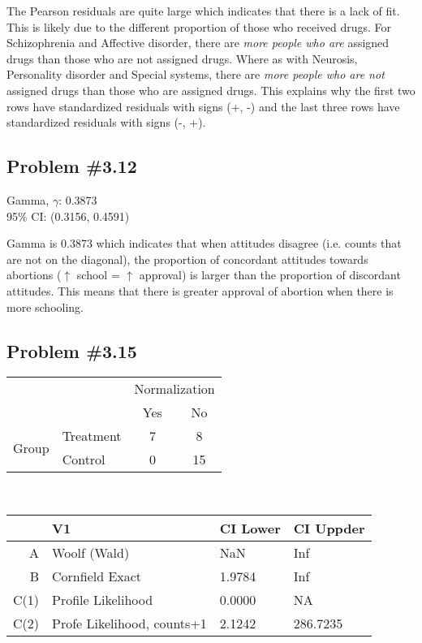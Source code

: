 \documentclass[12pt, letterpaper]{article}
\begin{document}
The Pearson residuals are quite large which indicates that there is a lack of fit.  This is likely due to the different proportion of those who received drugs.  For Schizophrenia and Affective disorder, there are\textit{ more people who are} assigned drugs than those who are not assigned drugs.  Where as with Neurosis, Personality disorder and Special systems, there are \textit{more people who are not} assigned drugs than those who are assigned drugs.  This explains why the first two rows have standardized residuals with signs (+, -) and the last three rows have standardized residuals with signs (-, +).  

\subsection*{Problem {\#}3.12}
Gamma, $\gamma$: 0.3873 \\
95\% CI: (0.3156, 0.4591)

Gamma is 0.3873 which indicates that when attitudes disagree (i.e. counts that are not on the diagonal), the proportion of concordant attitudes towards abortions ($\uparrow$ school = $\uparrow$ approval) is larger than the proportion of discordant attitudes.  This means that there is greater approval of abortion when there is more schooling.  

\subsection*{Problem {\#}3.15}

\begin{tabular}{c l cc }
	&			& \multicolumn{2}{c}{Normalization} \\
	&			& Yes	& No	\\ \cline{3-4} 
	\multirow{2}{*}{Group} & Treatment	& \multicolumn{1}{|c}{7}	& \multicolumn{1}{|c|}{8}\\ \cline{3-4} 
	& Control							& \multicolumn{1}{|c}{0}	& \multicolumn{1}{|c|}{15} \\ \cline{3-4}
\end{tabular} \\

\begin{table}[ht]
	\centering
	\begin{tabular}{rlll}
		\hline
		& V1 & CI Lower & CI Uppder \\ 
		\hline
		A & Woolf (Wald) & NaN & Inf \\ 
		B & Cornfield Exact & 1.9784 & Inf \\ 
		C(1) & Profile Likelihood & 0.0000 & NA \\ 
		C(2) & Profe Likelihood, counts+1 & 2.1242 & 286.7235 \\ 
		\hline
	\end{tabular}
\end{table}
\end{document}

